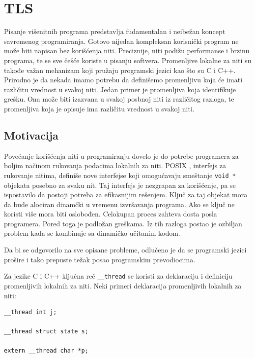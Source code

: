 \documentclass[12pt,oneside]{memoir}
\begin{document}
\chapter{TLS}
\label{chp:TLS}

Pisanje višenitnih programa predstavlja fudamentalan i neibežan koncept savremenog programiranja. Gotovo nijedan kompleksan korisnički program ne može biti napisan bez korišćenja niti. Preciznije, niti podižu performanse i brzinu programa, te se sve češće koriste u pisanju softvera. Promenljive lokalne za niti su takođe važan mehanizam koji pružaju programski jezici kao što su C i C++. Prirodno je da nekada imamo potrebu da definišemo promenljivu koja će imati različitu vrednost u svakoj niti. Jedan primer je promenljiva koja identifikuje grešku. Ona može biti izazvana u svakoj posbnoj niti iz različitog razloga, te promenljiva koja je opisuje ima različitu vrednost u svakoj niti.

\section{Motivacija}

Povećanje korišćenja niti u programiranju dovelo je do potrebe programera za boljim načinom rukovanja podacima lokalnih za niti. POSIX \cite{POSIX}, interfejs za rukovanje nitima, definiše nove interfejse koji omogućavaju smeštanje \texttt{void *} objekata posebno za svaku nit. Taj interfejs je nezgrapan za korišćenje, pa se ispostavilo da postoji potreba za efikasnijim rešenjem. Ključ za taj objekat mora da bude alociran dinamčki u vremenu izvršavanja programa. Ako se ključ ne koristi više mora biti oslobođen. Celokupan proces zahteva dosta posla programera. Pored toga je podložan greškama. Iz tih razloga postao je ozbiljan problem kada se kombinuje sa dinamičko učitanim kodom.

Da bi se odgovorilo na sve opisane probleme, odlučeno je da se programski jezici prošire i tako prepuste težak posao programskim prevodiocima.

Za jezike C i C++ ključna reč \texttt{\_\_thread} se koristi za deklaraciju i definiciju promenljivih lokalnih za niti. Neki primeri deklaracija promenljivih lokalnih za niti:

\begin{lstlisting}
__thread int j;

__thread struct state s;

extern __thread char *p;

\end{lstlisting}
\end{document}
